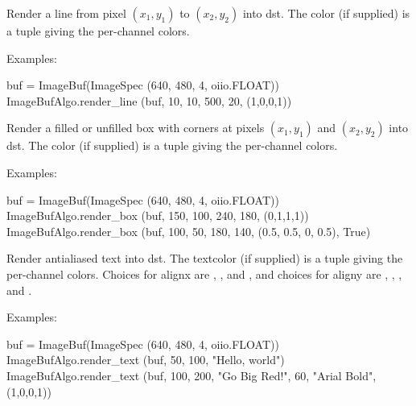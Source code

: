  

Render a line from pixel $(x_1,y_1)$ to $(x_2,y_2)$ into {\cf dst}.  The
{\cf color} (if supplied) is a tuple giving the per-channel colors.

\smallskip
\noindent Examples:
\begin{code}
    buf = ImageBuf(ImageSpec (640, 480, 4, oiio.FLOAT))
    ImageBufAlgo.render_line (buf, 10, 10, 500, 20, (1,0,0,1))
\end{code}
\apiend


 

Render a filled or unfilled box with corners at pixels $(x_1,y_1)$ and
$(x_2,y_2)$ into {\cf dst}.  The {\cf color} (if supplied) is a tuple giving
the per-channel colors.

\smallskip
\noindent Examples:
\begin{code}
    buf = ImageBuf(ImageSpec (640, 480, 4, oiio.FLOAT))
    ImageBufAlgo.render_box (buf, 150, 100, 240, 180, (0,1,1,1))
    ImageBufAlgo.render_box (buf, 100, 50, 180, 140, (0.5, 0.5, 0, 0.5), True)
\end{code}
\apiend


 

Render antialiased text into {\cf dst}.  The {\cf textcolor} (if supplied)
is a tuple giving the per-channel colors. Choices for {\cf alignx} are
, , and , and choices for {\cf aligny} are
, , , and .

\smallskip
\noindent Examples:
\begin{code}
    buf = ImageBuf(ImageSpec (640, 480, 4, oiio.FLOAT))
    ImageBufAlgo.render_text (buf, 50, 100, "Hello, world")
    ImageBufAlgo.render_text (buf, 100, 200, "Go Big Red!",
                              60, "Arial Bold", (1,0,0,1))
\end{code}
\apiend


